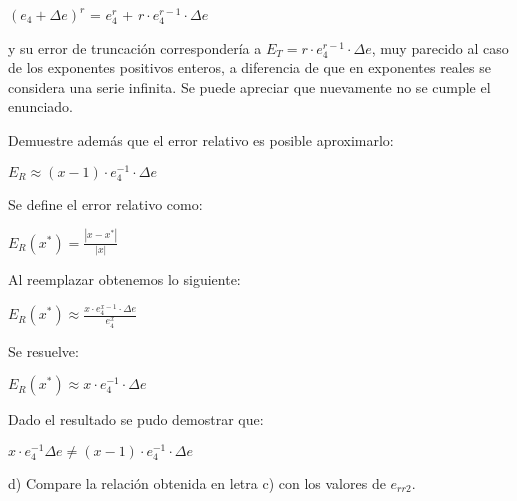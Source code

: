 \documentclass[]{article}
\begin{document}
\begin{center}
	$(e_{4} + \Delta{e})^{r}$ = $e_{4}^{r}$ +  $r\cdot{e_{4}^{r-1}}\cdot\Delta{e}$
\end{center}

 
\begin{flushleft}
	 y su error de truncación correspondería a $E_{T} = r\cdot{e_{4}^{r-1}}\cdot\Delta{e}$, muy parecido al caso de los exponentes positivos enteros, a diferencia de que en exponentes reales se considera una serie infinita. Se puede apreciar que nuevamente no se cumple el enunciado. \\

\end{flushleft}
Demuestre además que el error relativo es posible aproximarlo: 
\begin{center} $E_{R} \approx (x-1) \cdot e_{4}^{-1}\cdot \Delta e$ \end{center} 
\begin{flushleft}
	Se define el error relativo como:
\end{flushleft}

\begin{center} $E_{R} (x^{*}) = \displaystyle\frac{|x-x^{*}|}{|x|} $ \\
\end{center}

\begin{flushleft}	
Al reemplazar obtenemos lo siguiente:
\end{flushleft}

\begin{center}
	$E_{R}(x^{*}) \approx\displaystyle\frac{x\cdot{e_{4}^{x-1}}\cdot\Delta{e}}{e^{x}_{4}}$
\end{center}

\begin{flushleft}
	Se resuelve:
\end{flushleft}

\begin{center}
	$E_{R}(x^{*}) \approx\displaystyle{x\cdot{e_{4}^{-1}}\cdot\Delta{e}}$
\end{center}

\begin{flushleft}
	Dado el resultado se pudo demostrar que:
\end{flushleft}
\begin{center}
	 $\displaystyle{x\cdot{e_{4}^{-1}}\Delta{e}} \neq (x-1) \cdot e_{4}^{-1}\cdot \Delta e$
\end{center} 
	

\begin{flushleft}
		d) Compare la relación obtenida en letra c) con los valores de $e_{rr2}$. \\
\end{flushleft}
\end{document}
